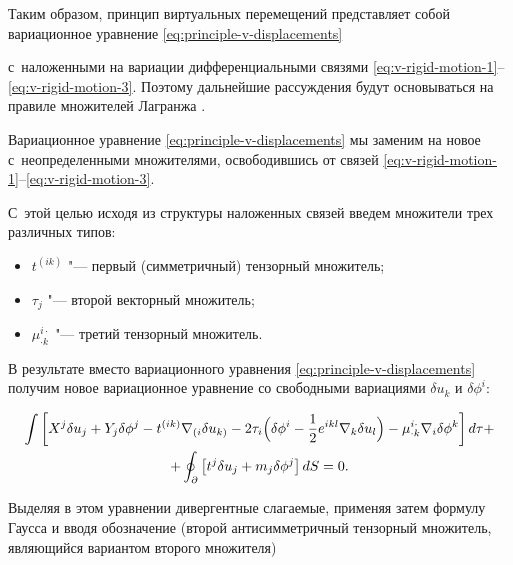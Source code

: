 Таким образом, принцип виртуальных перемещений представляет собой вариационное уравнение \eqref{eq:principle-v-displacements} 

с~наложенными на вариации дифференциальными связями \eqref{eq:v-rigid-motion-1}--\eqref{eq:v-rigid-motion-3}. Поэтому дальнейшие рассуждения будут основываться на правиле множителей Лагранжа \cite{Gunther-1941, Gelfand-Fomin-1961}. 

Вариационное уравнение \eqref{eq:principle-v-displacements} мы заменим на новое с~неопределенными множителями, освободившись от связей \eqref{eq:v-rigid-motion-1}--\eqref{eq:v-rigid-motion-3}. 

С~этой целью исходя из структуры наложенных связей введем множители трех различных типов:

\begin{itemize}

\item \(t^{(ik)}\) "--- первый (симметричный) тензорный множитель;

\item \(\tau_j\) "--- второй векторный множитель;

\item \(\mu^{i\cdot}_{\cdot k}\) "--- третий тензорный множитель.



\end{itemize}



В результате вместо вариационного уравнения \eqref{eq:principle-v-displacements} получим новое вариационное уравнение со свободными вариациями \(\delta u_k\) и \(\delta\phi^i\):

\begin{multline}

\int\left[{X^j\delta u_j+Y_j\delta\phi^j-t^{(ik)}\nabla_{(i}\delta u_{k)}-2\tau_i

\Bigl({\delta\phi^i-\dfrac{1}{2}e^{ikl}\nabla_k\delta u_l}\Bigr)-\mu^{i\cdot}_{\cdot k}\nabla_i\delta\phi^k}\right]d\tau+\\

+\oint _\partial\left[{t^j\delta u_j+m_j\delta\phi^j}\right]dS=0.

\label{eq:principle-v-displacements*}

\end{multline}

Выделяя в этом уравнении дивергентные слагаемые, применяя затем формулу Гаусса и вводя обозначение (второй антисимметричный тензорный множитель, являющийся вариантом второго множителя)

